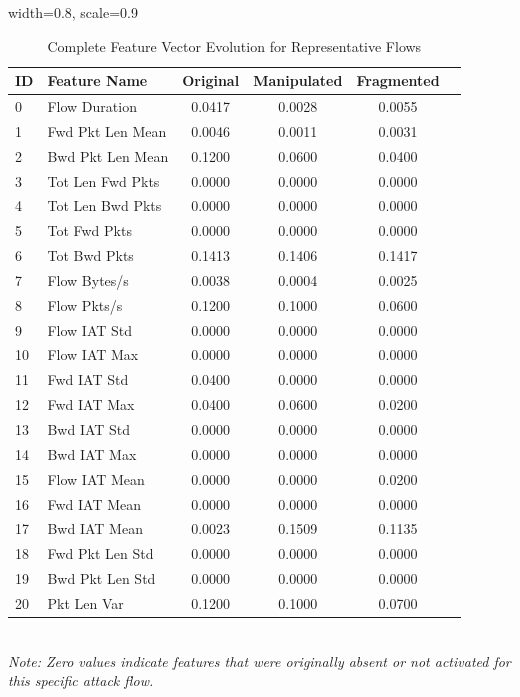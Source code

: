 \begin{table}[H]
\centering
\caption{Complete Feature Vector Evolution for Representative Flows}
\label{tab:single_flow_evolution}
\begin{adjustbox}{width=0.8\textwidth, scale=0.9}
\begin{tabular}{llcccc}
\hline
\textbf{ID} & \textbf{Feature Name} & \textbf{Original} & \textbf{Manipulated} & \textbf{Fragmented} \\ \hline
0 & Flow Duration & 0.0417 & 0.0028 & 0.0055 \\
1 & Fwd Pkt Len Mean & 0.0046 & 0.0011 & 0.0031 \\
2 & Bwd Pkt Len Mean & 0.1200 & 0.0600 & 0.0400 \\
3 & Tot Len Fwd Pkts & 0.0000 & 0.0000 & 0.0000 \\
4 & Tot Len Bwd Pkts & 0.0000 & 0.0000 & 0.0000 \\
5 & Tot Fwd Pkts & 0.0000 & 0.0000 & 0.0000 \\
6 & Tot Bwd Pkts & 0.1413 & 0.1406 & 0.1417 \\
7 & Flow Bytes/s & 0.0038 & 0.0004 & 0.0025 \\
8 & Flow Pkts/s & 0.1200 & 0.1000 & 0.0600 \\
9 & Flow IAT Std & 0.0000 & 0.0000 & 0.0000 \\
10 & Flow IAT Max & 0.0000 & 0.0000 & 0.0000 \\
11 & Fwd IAT Std & 0.0400 & 0.0000 & 0.0000 \\
12 & Fwd IAT Max & 0.0400 & 0.0600 & 0.0200 \\
13 & Bwd IAT Std & 0.0000 & 0.0000 & 0.0000 \\
14 & Bwd IAT Max & 0.0000 & 0.0000 & 0.0000 \\
15 & Flow IAT Mean & 0.0000 & 0.0000 & 0.0200 \\
16 & Fwd IAT Mean & 0.0000 & 0.0000 & 0.0000 \\
17 & Bwd IAT Mean & 0.0023 & 0.1509 & 0.1135 \\
18 & Fwd Pkt Len Std & 0.0000 & 0.0000 & 0.0000 \\
19 & Bwd Pkt Len Std & 0.0000 & 0.0000 & 0.0000 \\
20 & Pkt Len Var & 0.1200 & 0.1000 & 0.0700 \\ \hline
\end{tabular}
\end{adjustbox}
\vspace{0.1cm}
{\small \\\textit{Note: Zero values indicate features that were originally absent or not activated for this specific attack flow.}}
\end{table}

